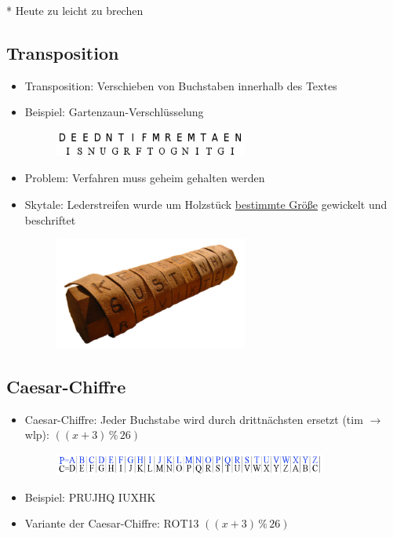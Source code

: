 \documentclass[openany]{book}
\begin{document}
* Heute zu leicht zu brechen

\subsection{Transposition}

\begin{itemize}
    \item Transposition: Verschieben von Buchstaben innerhalb des Textes
    \item Beispiel: Gartenzaun-Verschlüsselung
    \begin{figure}[h!]
        \centering
        \includegraphics[width=0.6\textwidth]{Pics/Transposition.PNG}
    \end{figure}
    \item Problem: Verfahren muss geheim gehalten werden \\
    \item Skytale: Lederstreifen wurde um Holzstück \underline{bestimmte Größe} gewickelt und beschriftet
    \begin{figure}[h!]
        \centering
        \includegraphics[width=0.6\textwidth]{Pics/Encryption2.PNG}
    \end{figure}
\end{itemize}

\subsection{Caesar-Chiffre}

\begin{itemize}
    \item Caesar-Chiffre: Jeder Buchstabe wird durch drittnächsten ersetzt (tim $\rightarrow$ wlp): $((x+3)\, \% \, 26)$
    \begin{figure}[h!]
        \centering
        \includegraphics[width=0.85\textwidth]{Pics/CaesarCypher.PNG}
    \end{figure}
    \item Beispiel: PRUJHQ IUXHK
    \item Variante der Caesar-Chiffre: ROT13 $((x+3)\, \% \, 26)$
\end{itemize}
\end{document}
